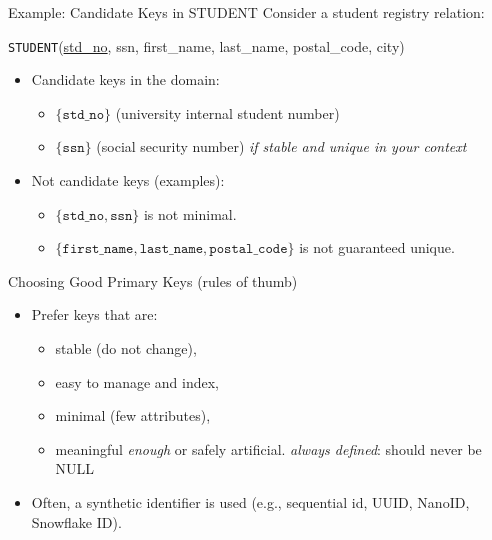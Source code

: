 \documentclass[10pt,aspectratio=169]{beamer}
\newcommand{\keyattr}[1]{\underline{#1}}
\begin{document}
\begin{frame}{Example: Candidate Keys in STUDENT}
\small
Consider a student registry relation:
\begin{center}
\texttt{STUDENT}(\keyattr{std\_no},\; ssn,\; first\_name,\; last\_name,\; postal\_code,\; city)
\end{center}

\begin{itemize}
  \item Candidate keys in the domain:
  \begin{itemize}
    \item $\{\texttt{std\_no}\}$ (university internal student number)
    \item $\{\texttt{ssn}\}$ (social security number) \emph{if stable and unique in your context}
  \end{itemize}
  \item Not candidate keys (examples):
  \begin{itemize}
    \item $\{\texttt{std\_no},\texttt{ssn}\}$ is not minimal.
    \item $\{\texttt{first\_name},\texttt{last\_name},\texttt{postal\_code}\}$ is not guaranteed unique.
  \end{itemize}
\end{itemize}
\end{frame}

\begin{frame}{Choosing Good Primary Keys (rules of thumb)}
\small
\begin{itemize}
  \item Prefer keys that are:
  \begin{itemize}
    \item stable (do not change),
    \item easy to manage and index,
    \item minimal (few attributes),
    \item meaningful \emph{enough} or safely artificial.
    \emph{always defined}: should never be NULL
  \end{itemize}
  \item Often, a synthetic identifier is used (e.g., sequential id, UUID, NanoID, Snowflake ID).
\end{itemize}
\end{frame}
\end{document}
